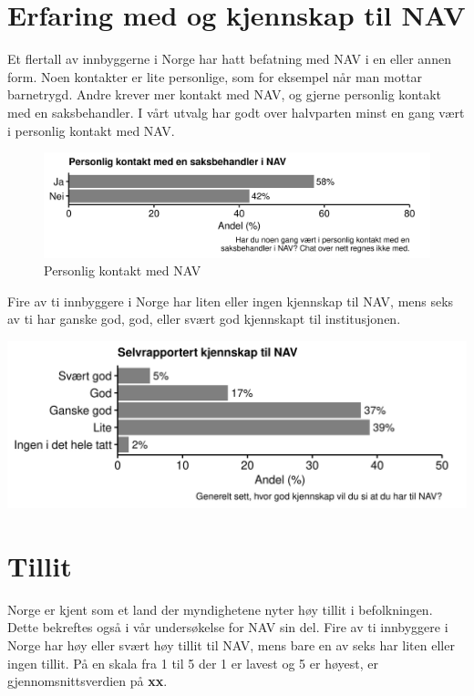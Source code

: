 \documentclass[
]{book}
\begin{document}
\hypertarget{erfaring-med-og-kjennskap-til-nav}{%
\section{Erfaring med og kjennskap til NAV}\label{erfaring-med-og-kjennskap-til-nav}}

Et flertall av innbyggerne i Norge har hatt befatning med NAV i en eller annen form.
Noen kontakter er lite personlige, som for eksempel når man mottar barnetrygd.
Andre krever mer kontakt med NAV, og gjerne personlig kontakt med en saksbehandler.
I vårt utvalg har godt over halvparten minst en gang vært i personlig kontakt med NAV.

\begin{figure}
\centering
\includegraphics{figs/png/fig_nav_personal_contact.png}
\caption{Personlig kontakt med NAV}
\end{figure}

Fire av ti innbyggere i Norge har liten eller ingen kjennskap til NAV, mens seks av ti har ganske god, god, eller svært god kjennskapt til institusjonen.

\includegraphics{figs/png/fig_nav_knowledge.png}

\hypertarget{tillit}{%
\section{Tillit}\label{tillit}}

Norge er kjent som et land der myndighetene nyter høy tillit i befolkningen.
Dette bekreftes også i vår undersøkelse for NAV sin del.
Fire av ti innbyggere i Norge har høy eller svært høy tillit til NAV, mens bare en av seks har liten eller ingen tillit.
På en skala fra 1 til 5 der 1 er lavest og 5 er høyest, er gjennomsnittsverdien på \textbf{xx}.
\end{document}
